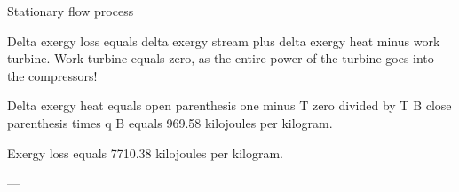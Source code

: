Stationary flow process  

Delta exergy loss equals delta exergy stream plus delta exergy heat minus work turbine.  
Work turbine equals zero, as the entire power of the turbine goes into the compressors!  

Delta exergy heat equals open parenthesis one minus T zero divided by T B close parenthesis times q B equals 969.58 kilojoules per kilogram.  

Exergy loss equals 7710.38 kilojoules per kilogram.  

---